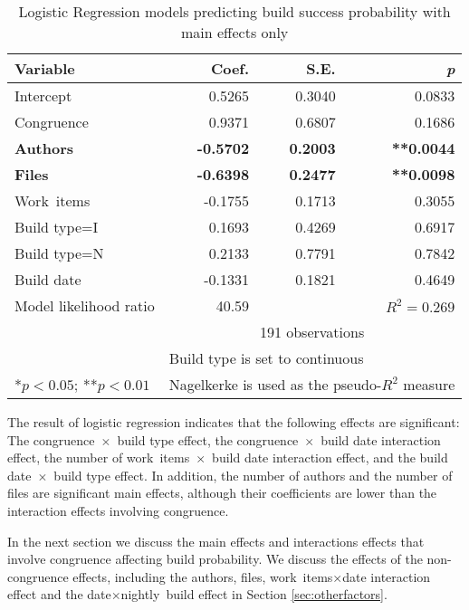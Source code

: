 \begin{table}[t]
\begin{center}
\begin{tabular}{l@{\hspace{15pt}}rr r}
\toprule
Variable & Coef. & S.E. & \emph{p} \\
	\midrule                                                                
	Intercept                &  0.5265 & 0.3040 & 0.0833 \\
	Congruence               &  0.9371 & 0.6807 & 0.1686 \\
	\textbf{Authors}         & \textbf{-0.5702} & \textbf{0.2003} & \textbf{**0.0044}  \\
	\textbf{Files}           & \textbf{-0.6398} & \textbf{0.2477} & \textbf{**0.0098} \\
	Work~items                & -0.1755 & 0.1713 & 0.3055  \\
	Build type=I                   &  0.1693 & 0.4269 & 0.6917  \\
	Build type=N                   &  0.2133 & 0.7791 & 0.7842  \\
	Build date               & -0.1331 & 0.1821 & 0.4649  \\
	\bottomrule
Model likelihood ratio & 40.59 &  & $R^2=0.269$  \\
& \multicolumn{3}{c}{191 observations}  \\
\multicolumn{1}{l}{ } & \multicolumn{3}{l}{\scriptsize{Build type is set to continuous}} \\
\multicolumn{1}{l}{\scriptsize{*$p < 0.05$; **$p < 0.01$}} & \multicolumn{3}{l}{\scriptsize{Nagelkerke is used as the pseudo-$R^2$ measure}}
\end{tabular}
\end{center}
\caption{Logistic Regression models predicting build success probability with main effects only}
\label{tab:logr_maineffects}
\end{table}

The result of logistic regression indicates that the following effects are significant: The congruence~$\times$~build type effect, the congruence~$\times$~build date interaction effect, the number of work~items~$\times$~build date interaction effect, and the build date~$\times$~build type effect. In addition, the number of authors and the number of files are significant main effects, although their coefficients are lower than the interaction effects involving congruence.

In the next section we discuss the main effects and interactions effects that involve congruence affecting build probability. We discuss the effects of the non-congruence effects, including the authors, files, work~items$\times$date interaction effect and the date$\times$nightly~build effect in Section \ref{sec:otherfactors}.

